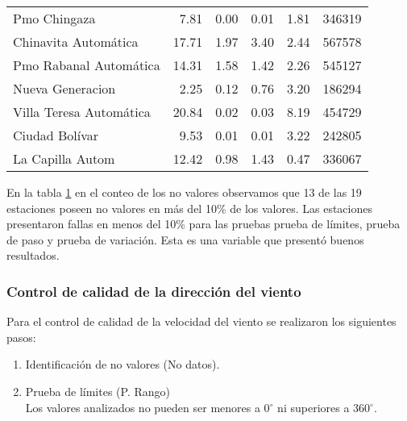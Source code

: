 \begin{table}[H]
\begin{center}
\begin{tabular}{p{3cm}rrrrr}
            Pmo Chingaza &       7.81 &      0.00 &           0.01 &          1.81 &        346319 \\
    Chinavita Automática &      17.71 &      1.97 &           3.40 &          2.44 &        567578 \\
  Pmo Rabanal Automática &      14.31 &      1.58 &           1.42 &          2.26 &        545127 \\
        Nueva Generacion &       2.25 &      0.12 &           0.76 &          3.20 &        186294 \\
 Villa Teresa Automática &      20.84 &      0.02 &           0.03 &          8.19 &        454729 \\
          Ciudad Bolívar &       9.53 &      0.01 &           0.01 &          3.22 &        242805 \\
        La Capilla Autom &      12.42 &      0.98 &           1.43 &          0.47 &        336067 \\
\bottomrule
\end{tabular}		
		\label{tabla:val_vel_viento}
\end{center}
\end{table}

En la tabla \ref{tabla:val_vel_viento} en el conteo de los no valores observamos que 13 de las 19 estaciones poseen no valores en más del 10\% de los valores. Las estaciones presentaron fallas en menos del 10\% para las pruebas prueba de límites, prueba de paso y prueba de variación. Esta es una variable que presentó buenos resultados.

\subsubsection{Control de calidad de la dirección del viento}

Para el control de calidad de la velocidad del viento se realizaron los siguientes pasos:

\begin{enumerate}
\item Identificación de no valores (No datos).\\

\item Prueba de límites (P. Rango)\\
Los valores analizados no pueden ser menores a 0$^{\circ}$ ni superiores a 360$^{\circ}$.
\end{enumerate}

